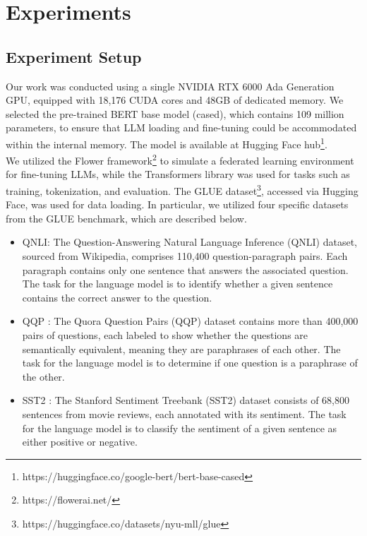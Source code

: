  

\section{Experiments}
 
\subsection{Experiment Setup}
Our work was conducted using a single NVIDIA RTX 6000 Ada Generation GPU, equipped with 18,176 CUDA cores and 48GB of dedicated memory. We selected the pre-trained BERT base model (cased), which contains 109 million parameters, to ensure that LLM loading and fine-tuning could be accommodated within the internal memory. The model is available at Hugging Face hub\footnote{https://huggingface.co/google-bert/bert-base-cased}.
\\
We utilized the Flower framework\footnote{https://flowerai.net/} to simulate a federated learning environment for fine-tuning LLMs, while the Transformers library was used for tasks such as training, tokenization, and evaluation. The GLUE dataset\footnote{https://huggingface.co/datasets/nyu-mll/glue}, accessed via Hugging Face, was used for data loading. In particular, we utilized four specific datasets from the GLUE benchmark, which are described below.

\begin{itemize}
\item 
QNLI: The Question-Answering Natural Language Inference (QNLI) dataset, sourced from Wikipedia, comprises 110,400 question-paragraph pairs. Each paragraph contains only one sentence that answers the associated question. The task for the language model is to identify whether a given sentence contains the correct answer to the question.
\item 
QQP \cite{wang2019superglue}: The Quora Question Pairs (QQP) dataset contains more than 400,000 pairs of questions, each labeled to show whether the questions are semantically equivalent, meaning they are paraphrases of each other. The task for the language model is to determine if one question is a paraphrase of the other.
\item 
SST2 \cite{socher2013recursive}: The Stanford Sentiment Treebank (SST2) dataset consists of 68,800 sentences from movie reviews, each annotated with its sentiment. The task for the language model is to classify the sentiment of a given sentence as either positive or negative.
\end{itemize}
 

